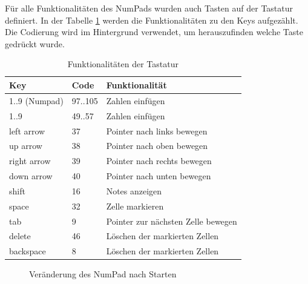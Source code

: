 Für alle Funktionalitäten des NumPads wurden auch Tasten auf der Tastatur definiert. In der Tabelle \ref{tab:tastatur} werden die Funktionalitäten zu den Keys aufgezählt. Die Codierung wird im Hintergrund verwendet, um herauszufinden welche Taste gedrückt wurde.

\begin{table}[H]
	\centering
	\begin{tabular}{lll}
		\hline
		Key         & Code    & Funktionalität                     \\ \hline
		1..9 (Numpad)       & 97..105 & Zahlen einfügen                    \\
		1..9        & 49..57  & Zahlen einfügen                    \\
		left arrow  & 37      & Pointer nach links bewegen         \\
		up arrow    & 38      & Pointer nach oben bewegen          \\
		right arrow & 39      & Pointer nach rechts bewegen        \\
		down arrow  & 40      & Pointer nach unten bewegen         \\
		shift       & 16      & Notes anzeigen                     \\
		space       & 32      & Zelle markieren                    \\
		tab         & 9       & Pointer zur nächsten Zelle bewegen \\
		delete      & 46      & Löschen der markierten Zellen      \\
		backspace   & 8       & Löschen der markierten Zellen      \\ \hline
	\end{tabular}%
	\caption{Funktionalitäten der Tastatur}
	\label{tab:tastatur}
\end{table}



\begin{figure}[H]
	\centering
	\qquad
	\caption{Veränderung des NumPad nach Starten}%
\end{figure}


